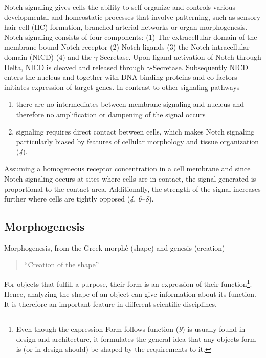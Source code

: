 \documentclass[10pt, b5paper, singlespacinge, twoside]{reedthesis} %
\providecommand{\tightlist}{%
  \setlength{\itemsep}{0pt}\setlength{\parskip}{0pt}}
\theoremstyle{definition}
\theoremstyle{definition}
\theoremstyle{definition}
\theoremstyle{remark}
\begin{document}
Notch signaling gives cells the ability to self-organize and controls various developmental and homeostatic processes that involve patterning, such as sensory hair cell (HC) formation, branched arterial networks or organ morphogenesis. Notch signaling consists of four components:
(1) The extracellular domain of the membrane bound Notch receptor (2) Notch ligands (3) the Notch intracellular domain (NICD) (4) and the \(\gamma\)-Secretase. Upon ligand activation of Notch through Delta, NICD is cleaved and released through \(\gamma\)-Secretase. Subsequently NICD enters the nucleus and together with DNA-binding proteins and co-factors initiates expression of target genes. In contrast to other signaling pathways
\begin{enumerate}
\def\labelenumi{\arabic{enumi}.}
\tightlist
\item
  there are no intermediates between membrane signaling and nucleus and therefore no amplification or dampening of the signal occurs
\item
  signaling requires direct contact between cells, which makes Notch signaling particularly biased by features of cellular morphology and tissue organization (\emph{4}).
\end{enumerate}
Assuming a homogeneous receptor concentration in a cell membrane and since Notch signaling occurs at sites where cells are in contact, the signal generated is proportional to the contact area. Additionally, the strength of the signal increases further where cells are tightly opposed (\emph{4}, \emph{6}--\emph{8}).

\hypertarget{intro-morph}{%
\subsection{Morphogenesis}\label{intro-morph}}

Morphogenesis, from the Greek morphê (shape) and genesis (creation)
\begin{quote}
``Creation of the shape''
\end{quote}
For objects that fulfill a purpose, their form is an expression of their function\footnote{Even though the expression Form follows function (\emph{9}) is usually found in design and architecture, it formulates the general idea that any objects form is (or in design should) be shaped by the requirements to it.}. Hence, analyzing the shape of an object can give information about its function. It is therefore an important feature in different scientific disciplines.
\end{document}
